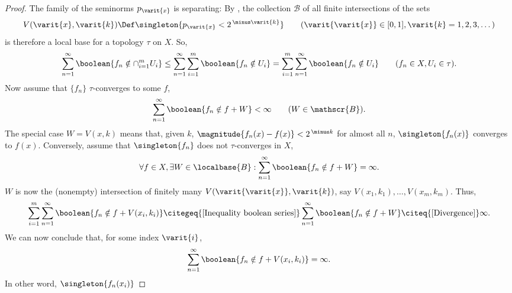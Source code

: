 \begin{proof}
The family of the seminorms $p_{\varit{x}}$ is separating: 
By , the collection $\mathscr{B}$ of all finite %
intersections of the sets %
%
  \begin{align}
    V(\varit{x},\varit{k})
      \Def 
    \singleton{p_\varit{x} < 2^{\,\minus \varit{k}}} 
      \quad\quad
    (\varit{\varit{x}} \in [0, 1], \varit{k}=1, 2, 3, \dots)
  \end{align}
%
is therefore a local base for a topology $\tau$ on $X$. 
So, 
%
  \begin{align}
    \label{Inequality boolean series}
    \sum_{n=1}^\infty \boolean{f_n \notin \cap_{i=1}^m U_i} \leq 
    \sum_{n=1}^\infty \sum_{i=1}^m \boolean{f_n \notin U_{i}} = 
    \sum_{i=1}^m \sum_{n=1}^\infty \boolean{f_n \notin U_i} %
    \quad\quad (f_n \in X, U_i \in \tau).
  \end{align}%
%
Now assume that $\{f_n\}$ $\tau$-converges to some $f$, \ie 
%
  \begin{align}
    \sum_{n=1}^\infty \boolean{f_n \notin f + W} < \infty \quad\quad 
      (W \in \mathscr{B}).
  \end{align}
The special case %
%
$W = V(x, k)$ %
%
means that, given $k$, %
%
  $\magnitude{f_n(x) - f(x)} < 2^{\,\minus k}$ %
%
for almost all $n$,  \ie 
  $\singleton{f_n(x)}$ converges to $f(x)$. 
Conversely, %
assume that $\singleton{f_n}$ does not $\tau$-converges in $X$, \ie 
%
  \begin{align}
    \label{Divergence}
    \forall f \in X, \exists W \in \localbase{B}: 
      \sum_{n=1}^\infty\boolean{f_n \notin f +  W} = \infty. 
  \end{align}
%
$W$ is now the (nonempty) intersection of finitely many %
%
$V(\varit{\varit{x}}, \varit{k})$, %
%
say  
%
  $ V(x_1, k_1), \dots, V(x_m, k_m)$. Thus,  %
%
  \begin{align}
    \sum_{i=1}^m \sum_{n=1}^\infty \boolean{f_n \notin f + V(x_i, k_i)}
        \citegeq{\ref{Inequality boolean series}} 
    \sum_{n=1}^\infty \boolean{f_n \notin f + W}
      \citeq{\ref{Divergence}} 
    \infty .
  \end{align}
%
We can now conclude that, for some index $\varit{i}$, 
%
  \begin{align}
    \sum_{n=1}^\infty \boolean{
      f_n \notin f + V(x_i, k_i)
    } = \infty .
  \end{align}
In other word, %
%
$\singleton{f_n(x_i)}$ %

\end{proof}
